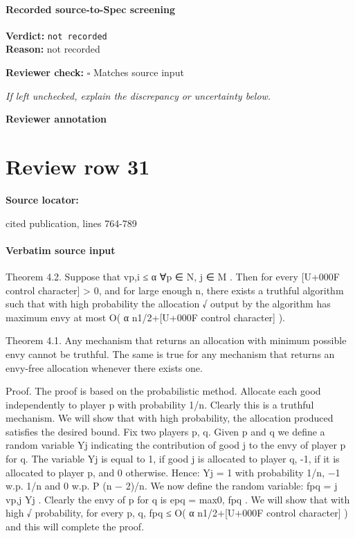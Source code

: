 \documentclass[10pt]{article}
\newcommand{\reviewerbox}{%
  \par\noindent\fbox{\parbox{0.96\linewidth}{\rule{0pt}{0.38in}}}\par
}
\newcommand{\reviewmatch}[1]{%
  \par\noindent\textbf{Reviewer check:} $\square$\; #1\par
  \noindent\emph{If left unchecked, explain the discrepancy or uncertainty below.}\par
}
\begin{document}
\paragraph{Recorded source-to-Spec screening}
\textbf{Verdict:} \texttt{not recorded}
\\
\textbf{Reason:} not recorded
\reviewmatch{Matches source input}
\noindent\textbf{Reviewer annotation}\par
\reviewerbox
\clearpage
\hypertarget{source-claim-1bcf19126f2645bf}{}
\section*{Review row 31}
\textbf{Source locator:} {\footnotesize\raggedright cited publication, lines 764-\allowbreak{}789\par}
\paragraph{Verbatim source input}
\begin{ReviewVerbatim}
Theorem 4.2. Suppose that vp,i ≤ α ∀p ∈ N, j ∈ M .
Then for every [U+000F control character] > 0, and for large enough n, there exists
a truthful algorithm such that with high probability the allocation
√ output by the algorithm has maximum envy at most
O( α n1/2+[U+000F control character] ).

Theorem 4.1. Any mechanism that returns an allocation
with minimum possible envy cannot be truthful. The same is
true for any mechanism that returns an envy-free allocation
whenever there exists one.

Proof. The proof is based on the probabilistic method.
Allocate each good independently to player p with probability 1/n. Clearly this is a truthful mechanism. We will show
that with high probability, the allocation produced satisfies
the desired bound. Fix two players p, q. Given p and q we
define a random variable Yj indicating the contribution of
good j to the envy of player p for q. The variable Yj is equal
to 1, if good j is allocated to player q, -1, if it is allocated to
player p, and 0 otherwise. Hence: Yj = 1 with probability
1/n, −1 w.p. 1/n and 0 w.p.
P (n − 2)/n. We now define
the random variable: fpq = j vp,j Yj . Clearly the envy of
p for q is epq = max{0, fpq }. We will show that with high
√
probability, for every p, q, fpq ≤ O( α n1/2+[U+000F control character] ) and this will
complete the proof.
\end{ReviewVerbatim}
\end{document}
